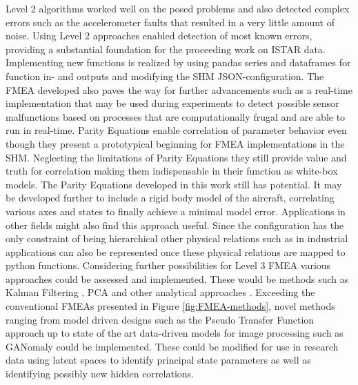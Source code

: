 Level 2 algorithms worked well on the posed problems and also detected complex errors such as the accelerometer faults that resulted in a very little amount of noise. Using Level 2 approaches enabled detection of most known errors, providing a substantial foundation for the proceeding work on ISTAR data. Implementing new functions is realized by using pandas series and dataframes for function in- and outputs and modifying the SHM JSON-configuration.
The FMEA developed also paves the way for further advancements such as a real-time implementation that may be used during experiments to detect possible sensor malfunctions based on processes that are computationally frugal and are able to run in real-time.
%
Parity Equations enable correlation of parameter behavior even though they present a prototypical beginning for FMEA implementations in the SHM. Neglecting the limitations of Parity Equations they still provide value and truth for correlation making them indispensable in their function as white-box models. The Parity Equations developed in this work still has potential. It may be developed further to include a rigid body model of the aircraft, correlating various axes and states to finally achieve a minimal model error.
Applications in other fields might also find this approach useful. Since the configuration has the only constraint of being hierarchical other physical relations such as in industrial applications can also be represented once these physical relations are mapped to python functions.
Considering further possibilities for Level 3 FMEA various approaches could be assessed and implemented. These would be methods such as Kalman Filtering \cite{lie_synthetic_2013}, PCA \cite{isermann_fault-diagnosis_2006} and other analytical approaches \cite{freeman_air_2013, perhinschi_integrated_2010}.  Exceeding the conventional FMEAs presented in Figure \ref{fig:FMEA-methods}, novel methods ranging from model driven designs such as the Pseudo Transfer Function approach \cite{aljanaideh_aircraft_2015} up to state of the art data-driven models for image processing such as GANomaly \cite{akcay_ganomaly_2018} could be implemented. These could be modified for use in research data using latent spaces to identify principal state parameters as well as identifying possibly new hidden correlations.

